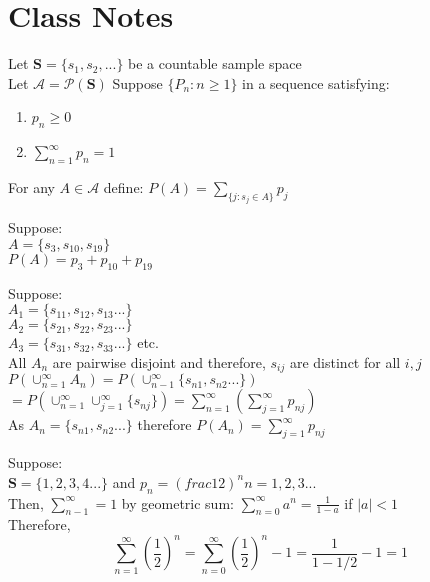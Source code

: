 \documentclass[12pt, oneside, letterpaper]{notes}
\begin{document}
\section{Class Notes}
\begin{myex}
	Let $\textbf{S} = \{s_1, s_2, ...\}$ be a countable sample  space \\
	Let $\mathscr{A} = \mathscr{P}(\textbf{S})$
	Suppose $\{P_n : n \geq 1\} $ in a sequence satisfying:
	\begin{enumerate}
		\item $p_n \geq 0$ 
		\item $\sum_{n=1}^{\infty}p_n = 1$
	\end{enumerate}
	For any $A \in \mathscr{A}$ define: $P(A) = \sum_{\{j: s_j \in A\}} p_j $

\begin{remark}
	Suppose: \\
	$A = \{s_3, s_{10}, s_{19} \}$ \\
	$P(A) = p_3 + p_{10} + p_{19}$ \\
	\vspace{3pt}
	
	\noindent Suppose: \\	
	$A_1 = \{s_{11}, s_{12}, s_{13} ... \}$ \\
	$A_2 = \{s_{21}, s_{22}, s_{23} ... \}$ \\
	$A_3 = \{s_{31}, s_{32}, s_{33} ... \}$ etc.\\
	All $A_n$ are pairwise disjoint and therefore, $s_{ij}$ are distinct
	for all $i,j$ \\
	$P(\cup_{n=1}^{\infty}A_n) = P(\cup_{n-1}^{\infty}\{s_{n1}, s_{n2}...\} )$ \\
	\indent $ = P(\cup_{n=1}^{\infty} \cup_{j=1}^{\infty} \{s_{nj}\}) =
	\sum_{n=1}^{\infty}(\sum_{j=1}^{\infty} p_{nj})  $ \\
	As $A_n = \{s_{n1}, s_{n2} ... \}$ therefore $P(A_n) = 
	\sum_{j=1}^{\infty}p_{nj} $ \\
	\vspace{3pt}

	\noindent Suppose: \\
	$\textbf{S} = \{1,2,3,4 ...\}$ and $p_n = (frac{1}{2})^n n=1,2,3 ...$ \\
	Then, $\sum_{n-1}^{\infty} = 1$ by geometric sum:
	$\sum_{n=0}^{\infty}a^n = \frac{1}{1-a}$ if $|a| < 1 $ \\
	Therefore, $$\sum_{n=1}^{\infty}(\frac{1}{2})^n 
	= \sum_{n=0}^{\infty}(\frac{1}{2})^n-1 = \frac{1}{1-1/2} -1 = 1$$

\end{remark}

\end{myex}
\end{document}
